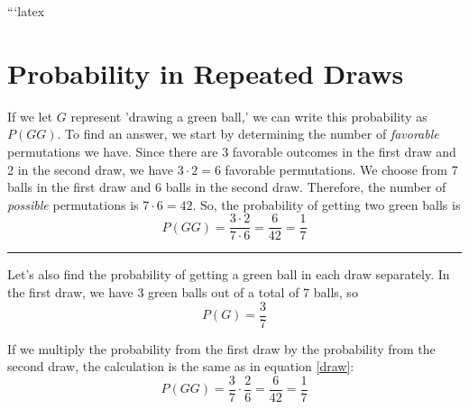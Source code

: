 ```latex
\section{Probability in Repeated Draws}
\qquad
{}

If we let $ G $ represent 'drawing a green ball,' we can write this probability as $ P(GG) $. To find an answer, we start by determining the number of \textsl{favorable} permutations we have. Since there are 3 favorable outcomes in the first draw and 2 in the second draw, we have $3\cdot2=6$ favorable permutations. We choose from 7 balls in the first draw and 6 balls in the second draw. Therefore, the number of \textsl{possible} permutations is $7\cdot6=42$. So, the probability of getting two green balls is
\begin{equation}
	P(GG)=\frac{3\cdot2}{7\cdot6}=\frac{6}{42}=\frac{1}{7} \label{draw}
\end{equation}
\rule{\linewidth}{1pt}
Let's also find the probability of getting a green ball in each draw separately. In the first draw, we have 3 green balls out of a total of 7 balls, so
\[ P(G)=\frac{3}{7} \]
\qquad
{}

If we multiply the probability from the first draw by the probability from the second draw, the calculation is the same as in equation \eqref{draw}:
\[ P(GG)=\frac{3}{7}\cdot\frac{2}{6}=\frac{6}{42}=\frac{1}{7} \]



